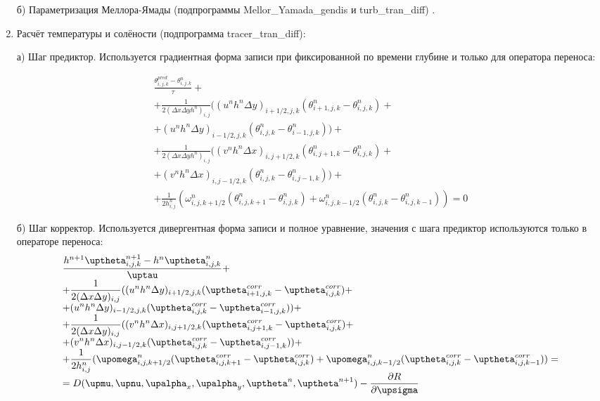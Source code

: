 \begin{enumerate}
	б) Параметризация Меллора-Ямады (подпрограммы Mellor\_Yamada\_gendis и turb\_tran\_diff) \cite{MellorYamada}.

\item Расчёт температуры и солёности (подпрограмма tracer\_tran\_diff):

а) Шаг предиктор. Используется градиентная форма записи при фиксированной по времени глубине и только для оператора переноса:

\begin{equation} \label{eq:inmsom/16} 
\begin{array}{l} 
\displaystyle{ \frac{\theta^{pred}_{i,j,k} - \theta^n_{i,j,k}}{\tau} + } \\
\displaystyle{ + \frac{1}{2 (\Delta x \Delta y h^n)_{i,j}} ( (u^n h^n \Delta y)_{i+1/2,j,k} (\theta^n_{i+1,j,k} - \theta^n_{i,j,k}) + } \\
\displaystyle{+ (u^n h^n \Delta y)_{i-1/2,j,k} (\theta^n_{i,j,k} - \theta^n_{i-1,j,k}) ) + } \\
\displaystyle{ + \frac{1}{2 (\Delta x \Delta y h^n)_{i,j}} ( (v^n h^n \Delta x)_{i,j+1/2,k} (\theta^n_{i,j+1,k} - \theta^n_{i,j,k}) + } \\
\displaystyle{+ (v^n h^n \Delta x)_{i,j-1/2,k} (\theta^n_{i,j,k} - \theta^n_{i,j-1,k}) ) + } \\
\displaystyle{ + \frac{1}{2 h^n_{i,j}} \left( \omega^n_{i,j,k+1/2}(\theta^n_{i,j,k+1} - \theta^n_{i,j,k}) + \omega^n_{i,j,k-1/2}(\theta^n_{i,j,k} - \theta^n_{i,j,k-1}) \right) = 0 }
\end{array} 
\end{equation} 

б) Шаг корректор. Используется дивергентная форма записи и полное уравнение, значения с шага предиктор используются только в операторе переноса:
\begin{equation} \label{eq:inmsom/17} 
\begin{array}{l} 
\displaystyle{ \frac{h^{n+1} \theta^{n+1}_{i,j,k} - h^n \theta^n_{i,j,k}}{\tau} + } \\
\displaystyle{ + \frac{1}{2 (\Delta x \Delta y)_{i,j}} ( (u^n h^n \Delta y)_{i+1/2,j,k} (\theta^{corr}_{i+1,j,k} - \theta^{corr}_{i,j,k}) + } \\
\displaystyle{+ (u^n h^n \Delta y)_{i-1/2,j,k} (\theta^{corr}_{i,j,k} - \theta^{corr}_{i-1,j,k}) ) + } \\
\displaystyle{ + \frac{1}{2 (\Delta x \Delta y)_{i,j}} ( (v^n h^n \Delta x)_{i,j+1/2,k} (\theta^{corr}_{i,j+1,k} - \theta^{corr}_{i,j,k}) + } \\
\displaystyle{+ (v^n h^n \Delta x)_{i,j-1/2,k} (\theta^{corr}_{i,j,k} - \theta^{corr}_{i,j-1,k}) ) + } \\
\displaystyle{ + \frac{1}{2 h^n_{i,j}} ( \omega^n_{i,j,k+1/2}(\theta^{corr}_{i,j,k+1} - \theta^{corr}_{i,j,k}) + \omega^n_{i,j,k-1/2}(\theta^{corr}_{i,j,k} - \theta^{corr}_{i,j,k-1}) ) = } \\
\displaystyle{ = D(\mu, \nu, \alpha_x, \alpha_y, \theta^n, \theta^{n+1}) - \d{R}{\sigma}}
\end{array} 
\end{equation} 


\end{enumerate}
